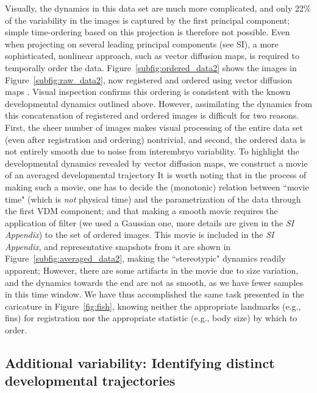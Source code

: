 \documentclass{pnastwo}
\begin{document}
\begin{article}
Visually, the dynamics in this data set are much more complicated, and only 22\% of the variability in the images is captured by the first principal component; simple time-ordering based on this projection is therefore not possible.
%
Even when projecting on several leading principal components (see SI), a more sophisticated, nonlinear approach, such as vector diffusion maps, 
is required to temporally order the data.
%
Figure~\ref{subfig:ordered_data2} shows the images in Figure~\ref{subfig:raw_data2}, now registered and ordered using vector diffusion maps \cite{singer2012vector}.
%
Visual inspection confirms this ordering is consistent with the known developmental dynamics outlined above.
%
However, assimilating the dynamics from this concatenation of registered and ordered images is difficult for two reasons.
%
First, the sheer number of images makes visual processing of the entire data set (even after registration and ordering) nontrivial, and
second, the ordered data is not entirely smooth due to noise from interembryo variability.
%
To highlight the developmental dynamics revealed by vector diffusion maps, we construct a movie of an averaged developmental trajectory 
%
It is worth noting that in the process of making such a movie, one has to decide the (monotonic) relation between
``movie time" (which is {\em not} physical time) and the parametrization of the data through the first VDM component; and that making a smooth movie
requires the application of filter (we used a Gaussian one, more details are given in the {\it SI Appendix}) to the set of ordered images.
%
This movie is included in the {\it SI Appendix},
and representative snapshots from it are shown in Figure~\ref{subfig:averaged_data2}, making the ``stereotypic" dynamics readily apparent;
%
However, there are some artifacts in the movie due to size variation, and the dynamics towards the end are not as smooth, as we have fewer samples in this time window.
%
%
We have thus accomplished the same task presented in the caricature in Figure~\ref{fig:fish}, knowing neither the appropriate landmarks (e.g., fins) for registration nor the appropriate statistic (e.g., body size) by which to order.



\subsection{Additional variability: Identifying distinct developmental trajectories}


\end{article}
\end{document}
